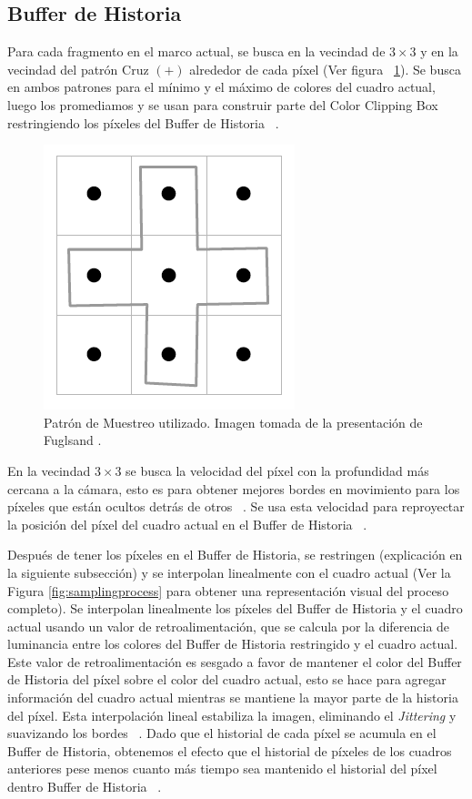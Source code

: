\documentclass[pregrado]{tesis-usb} %
\begin{document}
\subsection{Buffer de Historia}
Para cada fragmento en el marco actual, se busca en la vecindad de $3\times 3$ y en la vecindad del patrón Cruz $(+)$ alrededor de cada píxel (Ver figura ~\ref{fig:samplingpattern}). Se busca en ambos patrones para el mínimo y el máximo de colores del cuadro actual, luego los promediamos y se usan para construir parte del Color Clipping Box restringiendo los píxeles del Buffer de Historia ~\cite{Fuglsand2016}. 
\begin{figure}[!hbt]
	\centering
	\includegraphics[scale=0.8]{images/sampling_pattern.png}
	\caption{Patrón de Muestreo utilizado. Imagen tomada de la presentación de Fuglsand \protect\cite{Fuglsand2016}.}\label{fig:samplingpattern}
\end{figure}

En la vecindad $3\times 3$ se busca la velocidad del píxel con la profundidad más cercana a la cámara, esto es para obtener mejores bordes en movimiento para los píxeles que están ocultos detrás de otros ~\cite{Fuglsand2016}. Se usa esta velocidad para reproyectar la posición del píxel del cuadro actual en el Buffer de Historia ~\cite{Fuglsand2016, XU2016}. 

Después de tener los píxeles en el Buffer de Historia, se restringen (explicación en la siguiente subsección) y se interpolan linealmente con el cuadro actual (Ver la Figura \ref{fig:samplingprocess} para obtener una representación visual del proceso completo). Se interpolan linealmente los píxeles del Buffer de Historia y el cuadro actual usando un valor de retroalimentación, que se calcula por la diferencia de luminancia entre los colores del Buffer de Historia restringido y el cuadro actual. Este valor de retroalimentación es sesgado a favor de mantener el color del Buffer de Historia del píxel sobre el color del cuadro actual, esto se hace para agregar información del cuadro actual mientras se mantiene la mayor parte de la historia del píxel. Esta interpolación lineal estabiliza la imagen, eliminando el \textit{Jittering} y suavizando los bordes ~\cite{Fuglsand2016, XU2016}. Dado que el historial de cada píxel se acumula en el Buffer de Historia, obtenemos el efecto que el historial de píxeles de los cuadros anteriores pese menos cuanto más tiempo sea mantenido el historial del píxel dentro Buffer de Historia ~\cite{Fuglsand2016}. 
\end{document}
